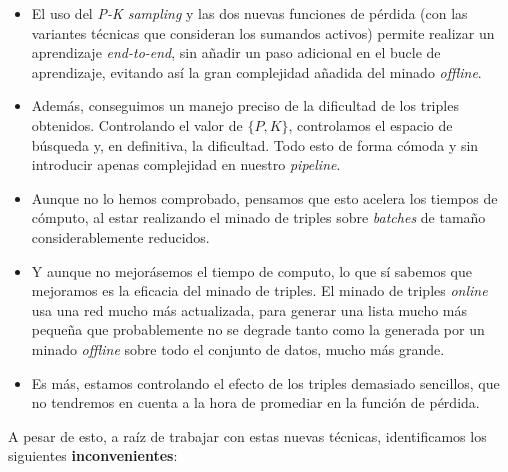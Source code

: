 \begin{itemize}
    \item El uso del \textit{P-K sampling} y las dos nuevas funciones de pérdida (con las variantes técnicas que consideran los sumandos activos) permite realizar un aprendizaje \textit{end-to-end}, sin añadir un paso adicional en el bucle de aprendizaje, evitando así la gran complejidad añadida del minado \textit{offline}.
    \item Además, conseguimos un manejo preciso de la dificultad de los triples obtenidos. Controlando el valor de $\{P, K\}$, controlamos el espacio de búsqueda y, en definitiva, la dificultad. Todo esto de forma cómoda y sin introducir apenas complejidad en nuestro \textit{pipeline}.
    \item Aunque no lo hemos comprobado, pensamos que esto acelera los tiempos de cómputo, al estar realizando el minado de triples sobre \textit{batches} de tamaño considerablemente reducidos.
    \item Y aunque no mejorásemos el tiempo de computo, lo que sí sabemos que mejoramos es la eficacia del minado de triples. El minado de triples \textit{online} usa una red mucho más actualizada, para generar una lista mucho más pequeña que probablemente no se degrade tanto como la generada por un minado \textit{offline} sobre todo el conjunto de datos, mucho más grande.
    \item Es más, estamos controlando el efecto de los triples demasiado sencillos, que no tendremos en cuenta a la hora de promediar en la función de pérdida.
\end{itemize}

A pesar de esto, a raíz de trabajar con estas nuevas técnicas, identificamos los siguientes \textbf{inconvenientes}:

